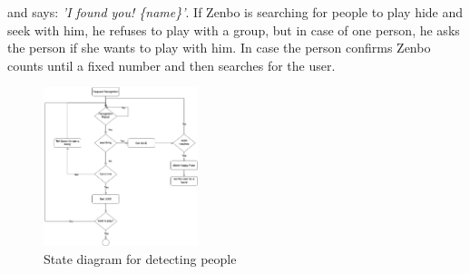 \documentclass[conference]{IEEEtran}
\begin{document}
and says: \textit{'I found you! \{name\}'}. If Zenbo is searching for people to play hide and seek with him, he refuses to play with a group, but 
in case of one person, he asks the person if she wants to play with him. In case the person confirms Zenbo counts until a fixed number and then searches for the user.
\begin{figure}[h]  \label{fig:computerVision}
	\begin{center}
		\includegraphics[width=0.4\textwidth]{pics/computerVisionFlow.png}
	\end{center}
	\caption{State diagram for detecting people}
\end{figure}
\end{document}

